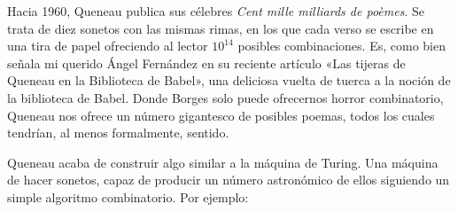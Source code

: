 \documentclass[11pt,a4paper]{article}
\begin{document}
%
%

Hacia 1960, Queneau publica sus célebres
\emph{Cent mille milliards de poèmes}. Se trata de diez sonetos con las mismas rimas, en los que cada verso se escribe en una tira de papel ofreciendo al lector $10^{14}$ posibles combinaciones. Es, como bien señala mi querido Ángel Fernández en su reciente artículo «Las tijeras de Queneau en la Biblioteca de Babel», una deliciosa vuelta de tuerca a la noción de la biblioteca de Babel. Donde Borges solo puede ofrecernos horror combinatorio, Queneau nos ofrece un número gigantesco de posibles poemas, todos los cuales tendrían, al menos formalmente, sentido.

Queneau acaba de construir algo similar a la máquina de Turing. Una máquina de hacer sonetos, capaz de producir un número astronómico de ellos siguiendo un simple algoritmo combinatorio. Por ejemplo: 
\end{document}

